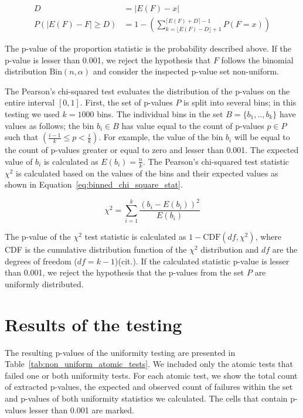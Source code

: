 \documentclass[
  digital,  	%
  color,		%
  oneside,   	%
  12pt,
  nocover,
  notable,
  nolof,
  nolot,
]{fithesis3}
\theoremstyle{definition}
\theoremstyle{remark}
\begin{document}
\begin{align}
D &= \lvert E(F) - x \rvert \\
\label{eq:prop_statistic}
P(\lvert E(F) - F \rvert \geq D) &= 1 - \left( \sum\limits_{k=\lfloor E(F)-D \rfloor + 1}^{\lceil E(F)+D \rceil - 1} P(F = x) \right)
\end{align}

The p-value of the proportion statistic is the probability described above. If the p-value is lesser than 0.001, we reject the hypothesis that $F$ follows the binomial distribution $\text{Bin}(n,\alpha)$ and consider the inspected p-value set non-uniform.

The Pearson's chi-squared test evaluates the distribution of the p-values on the entire interval $[0,1]$. First, the set of p-values $P$ is split into several bins; in this testing we used $k=1000$ bins. The individual bins in the set $B = \{b_1,..,b_k\}$ have values as follows; the bin $b_i \in B$ has value equal to the count of p-values $p \in P$ such that $\left(\frac{i-1}{k} \leq p < \frac{i}{k}\right)$. For example, the value of the bin $b_i$ will be equal to the count of p-values greater or equal to zero and lesser than 0.001. The expected value of $b_i$ is calculated as $E(b_i) = \frac{n}{k}$. The Pearson's chi-squared test statistic $\chi^2$ is calculated based on the values of the bins and their expected values as shown in Equation~\ref{eq:binned_chi_square_stat}.

\begin{equation}
\label{eq:binned_chi_square_stat}
\chi^2 = \sum\limits_{i=1}^{k} \frac{ \left( b_i - E(b_i) \right)^{2} }{E(b_i)}
\end{equation}

The p-value of the $\chi^2$ test statistic is calculated as $1-\text{CDF}(df, \chi^2)$, where CDF is the cumulative distribution function of the $\chi^2$ distribution and $df$ are the degrees of freedom ($df=k-1$)(cit.). If the calculated statistic p-value is lesser than 0.001, we reject the hypothesis that the p-values from the set $P$ are uniformly distributed.

\section{Results of the testing}
The resulting p-values of the uniformity testing are presented in Table~\ref{tab:non_uniform_atomic_tests}. We included only the atomic tests that failed one or both uniformity tests. For each atomic test, we show the total count of extracted p-values, the expected and observed count of failures within the set and p-values of both uniformity statistics we calculated. The cells that contain p-values lesser than 0.001 are marked.
\end{document}
